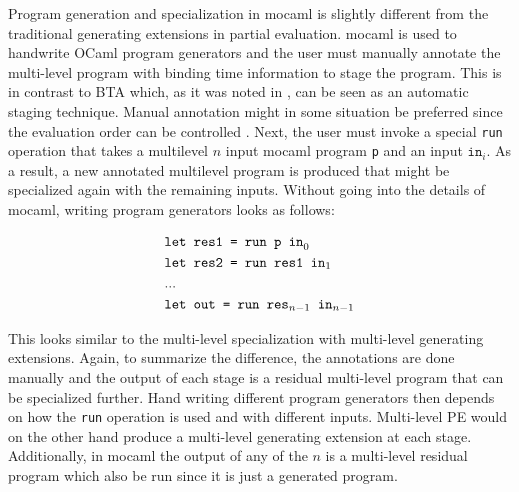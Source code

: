 Program generation and specialization in mocaml is slightly different from the traditional generating extensions in partial evaluation. mocaml is used to handwrite OCaml program generators and the user must manually annotate the multi-level program with binding time information to stage the program. This is in contrast to BTA which, as it was noted in \cite{metaML}, can be seen as an automatic staging technique. Manual annotation might in some situation be preferred since the evaluation order can be controlled \cite{metaML}. Next, the user must invoke a special \texttt{run} operation that takes a multilevel $n$ input mocaml program \texttt{p} and an input $\mathtt{in}_i$. As a result, a new annotated multilevel program is produced that might be specialized again with the remaining inputs. Without going into the details of mocaml, writing program generators looks as follows:

\begin{align*}
&\text{\texttt{let res1 = run p in}}_0\\
&\text{\texttt{let res2 = run res1 in}}_1\\
&...\\
&\text{\texttt{let out = run res$_{n-1}$ in$_{n-1}$}}
\end{align*}

This looks similar to the multi-level specialization with multi-level generating extensions. Again, to summarize the difference, the annotations are done manually and the output of each stage is a residual multi-level program that can be specialized further. Hand writing different program generators then depends on how the \texttt{run} operation is used and with different inputs. Multi-level PE would on the other hand produce a multi-level generating extension at each stage. Additionally, in mocaml the output of any of the $n$ is a multi-level residual program which also be run since it is just a generated program.

